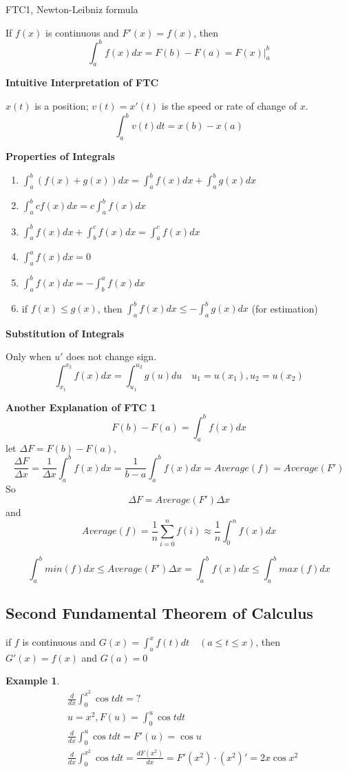 \documentclass{article}
\newtheorem{exmp}{Example}
\newcommand\defint[3]{\int_{#1}^{#2}#3dx}
\begin{document}
FTC1, Newton-Leibniz formula

If $f(x)$ is continuous and $F'(x) = f(x)$, then
$$\defint{a}{b}{f(x)} = F(b) - F(a) = F(x)\big|_a^b$$

\textbf{Intuitive Interpretation of FTC}

$x(t)$ is a position; $v(t) = x'(t)$ is the speed or rate of change of $x$.
$$\int_a^bv(t)dt = x(b) - x(a)$$

\textbf{Properties of Integrals}
\begin{enumerate}
  \item $\defint{a}{b}{(f(x) + g(x))} = \defint{a}{b}{f(x)} + \defint{a}{b}{g(x)}$
  \item $\defint{a}{b}{cf(x)} = c\defint{a}{b}{f(x)}$
  \item $\defint{a}{b}{f(x)} + \defint{b}{c}{f(x)} = \defint{a}{c}{f(x)}$
  \item $\defint{a}{a}{f(x)} = 0$
  \item $\defint{a}{b}{f(x)} = -\defint{b}{a}{f(x)}$
  \item if $f(x) \le g(x)$, then $\defint{a}{b}{f(x)} \le -\defint{a}{b}{g(x)}$ (for estimation)
\end{enumerate}

\textbf{Substitution of Integrals}

Only when $u'$ does not change sign.
$$\int_{x_1}^{x_2}f(x)dx = \int_{u_1}^{u_2}g(u)du \quad u_1 = u(x_1), u_2 = u(x_2)$$

\textbf{Another Explanation of FTC 1}
$$F(b) - F(a) = \int_a^bf(x)dx$$
let $\Delta F = F(b) - F(a)$,
$$\frac{\Delta F}{\Delta x} = \frac{1}{\Delta x}\int_a^bf(x)dx = \frac{1}{b-a}\int_a^bf(x)dx =Average(f) = Average(F')$$
So
$$\Delta F = Average(F')\Delta x$$
and
$$Average(f) = \frac{1}{n}\sum_{i=0}^nf(i) \approx \frac{1}{n}\int_0^nf(x)dx$$

$$\int_a^bmin(f)dx \le Average(F')\Delta x = \int_a^bf(x)dx \le \int_a^bmax(f)dx$$
\subsection{Second Fundamental Theorem of Calculus}
if $f$ is continuous and $G(x) = \int_a^xf(t)dt \quad (a \le t \le x)$, then $G'(x) = f(x)$ and $G(a) = 0$

\begin{exmp}
  \begin{align*}
    &\frac{d}{dx}\int_0^{x^2}\cos tdt = ? \\
    &u = x^2, F(u) = \int_0^u\cos tdt \\
    &\frac{d}{dx}\int_0^u\cos tdt = F'(u) = \cos u \\
    &\frac{d}{dx}\int_0^{x^2}\cos tdt = \frac{dF(x^2)}{dx} = F'(x^2)\cdot(x^2)' = 2x\cos x^2
  \end{align*}
\end{exmp}
\end{document}
